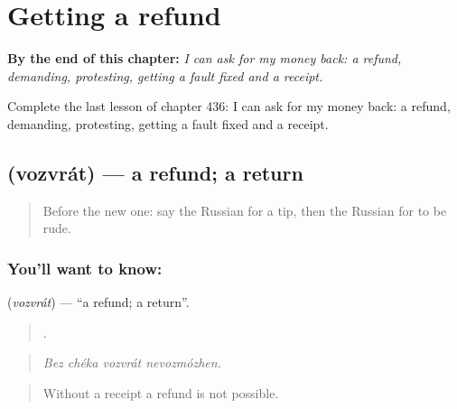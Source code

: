 
\chapter{Getting a refund}
\label{ch:ru-getting-a-refund}

\begin{chapteropening}
\textbf{By the end of this chapter:} \emph{I can ask for my money back: a refund, demanding, protesting, getting a fault fixed and a receipt.}

Complete the last lesson of chapter 436: I can ask for my money back: a refund, demanding, protesting, getting a fault fixed and a receipt.
\end{chapteropening}

\section[\texorpdfstring{\ru{возврат} (vozvrát)}{возврат (vozvrát)}]{ (vozvrát) — a refund; a return}

\label{lesson:RU-C436-vozvrat}



\begin{quote}
Before the new one: say the Russian for a tip, then the Russian for to be rude.
\end{quote}

\subsection*{You'll want to know: }
\textbf{} (\emph{vozvrát}) — \textquotedblleft{}a refund; a return\textquotedblright{}.

\begin{quote}
   .
\end{quote}

\begin{quote}
\emph{Bez chéka vozvrát nevozmózhen.}
\end{quote}

\begin{quote}
Without a receipt a refund is not possible.
\end{quote}

